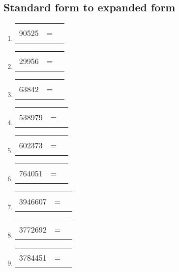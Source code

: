 \documentclass[11pt]{article}
\begin{document}
\subsection{Standard form to expanded form}
\begin{enumerate}
    \item \begin{tabular}{rcl} 90525 & = & \rule[-5pt]{10cm}{0.4pt} \end{tabular}
    \item \begin{tabular}{rcl} 29956 & = & \rule[-5pt]{10cm}{0.4pt} \end{tabular}
    \item \begin{tabular}{rcl} 63842 & = & \rule[-5pt]{10cm}{0.4pt} \end{tabular}
    \item \begin{tabular}{rcl} 538979 & = & \rule[-5pt]{10cm}{0.4pt} \end{tabular}
    \item \begin{tabular}{rcl} 602373 & = & \rule[-5pt]{10cm}{0.4pt} \end{tabular}
    \item \begin{tabular}{rcl} 764051 & = & \rule[-5pt]{10cm}{0.4pt} \end{tabular}
    \item \begin{tabular}{rcl} 3946607 & = & \rule[-5pt]{10cm}{0.4pt} \end{tabular}
    \item \begin{tabular}{rcl} 3772692 & = & \rule[-5pt]{10cm}{0.4pt} \end{tabular}
    \item \begin{tabular}{rcl} 3784451 & = & \rule[-5pt]{10cm}{0.4pt} \end{tabular}
\end{enumerate}

\newpage
\end{document}
